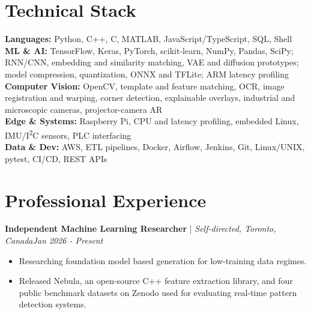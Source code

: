 \documentclass[11pt]{article}
\newenvironment{cvrole}[5]{%
  \par\noindent\textbf{\large #1} | \textit{\small #2, #3}\hfill \textit{\small #4 - #5}\par
  \begin{itemize}[leftmargin=2em, itemsep=-0.3em, topsep=-0.5em]%
}{%
  \end{itemize}\par\noindent\mbox{}\par\vspace{0.1em}%
}
\begin{document}
\section*{Technical Stack}

\textbf{Languages:} Python, C++, C, MATLAB, JavaScript/TypeScript, SQL, Shell\\
\textbf{ML \& AI:} TensorFlow, Keras, PyTorch, scikit-learn, NumPy, Pandas, SciPy; RNN/CNN, embedding and similarity matching, VAE and diffusion prototypes; model compression, quantization, ONNX and TFLite; ARM latency profiling\\
\textbf{Computer Vision:} OpenCV, template and feature matching, OCR, image registration and warping, corner detection, explainable overlays, industrial and microscopic cameras, projector-camera AR\\
\textbf{Edge \& Systems:} Raspberry Pi, CPU and latency profiling, embedded Linux, IMU/I\textsuperscript{2}C sensors, PLC interfacing\\
\textbf{Data \& Dev:} AWS, ETL pipelines, Docker, Airflow, Jenkins, Git, Linux/UNIX, pytest, CI/CD, REST APIs


\section*{Professional Experience}


\begin{cvrole}{Independent Machine Learning Researcher}{Self-directed}{Toronto, Canada}{Jan 2026}{Present}
    \item Researching foundation model based generation for low-training data regimes.
    \item Released Nebula, an open-source C++ feature extraction library, and four public benchmark datasets on Zenodo used for evaluating real-time pattern detection systems. 
\end{cvrole}
\end{document}
